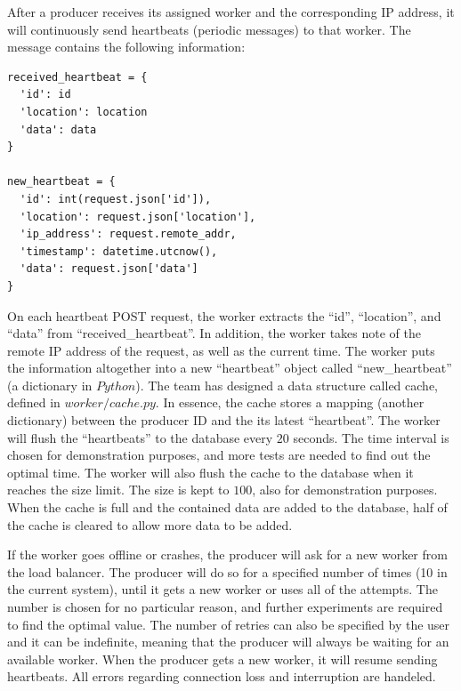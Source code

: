 \documentclass{sigchi}
\begin{document}
After a producer receives its assigned worker and the corresponding IP address, it will continuously send heartbeats (periodic messages) to that worker. The message contains the following information:

\vspace*{\baselineskip}
\begin{lstlisting}[caption={Heartbeat format}, mathescape, upquote=true]
received_heartbeat = {
  'id': id
  'location': location
  'data': data
}

new_heartbeat = {
  'id': int(request.json['id']),
  'location': request.json['location'],
  'ip_address': request.remote_addr,
  'timestamp': datetime.utcnow(),
  'data': request.json['data']
}
\end{lstlisting}

On each heartbeat POST request, the worker extracts the \enquote{id}, \enquote{location}, and \enquote{data} from \enquote{received\_heartbeat}. In addition, the worker takes note of the remote IP address of the request, as well as the current time. The worker puts the information altogether into a new \enquote{heartbeat} object called \enquote{new\_heartbeat} (a dictionary in $Python$). The team has designed a data structure called cache, defined in $worker/cache.py$. In essence, the cache stores a mapping (another dictionary) between the producer ID and the its latest \enquote{heartbeat}. The worker will flush the \enquote{heartbeats} to the database every $20$ seconds. The time interval is chosen for demonstration purposes, and more tests are needed to find out the optimal time. The worker will also flush the cache to the database when it reaches the size limit. The size is kept to $100$, also for demonstration purposes. When the cache is full and the contained data are added to the database, half of the cache is cleared to allow more data to be added.

If the worker goes offline or crashes, the producer will ask for a new worker from the load balancer. The producer will do so for a specified number of times (10 in the current system), until it gets a new worker or uses all of the attempts. The number is chosen for no particular reason, and further experiments are required to find the optimal value. The number of retries can also be specified by the user and it can be indefinite, meaning that the producer will always be waiting for an available worker. When the producer gets a new worker, it will resume sending heartbeats. All errors regarding connection loss and interruption are handeled.
\end{document}
